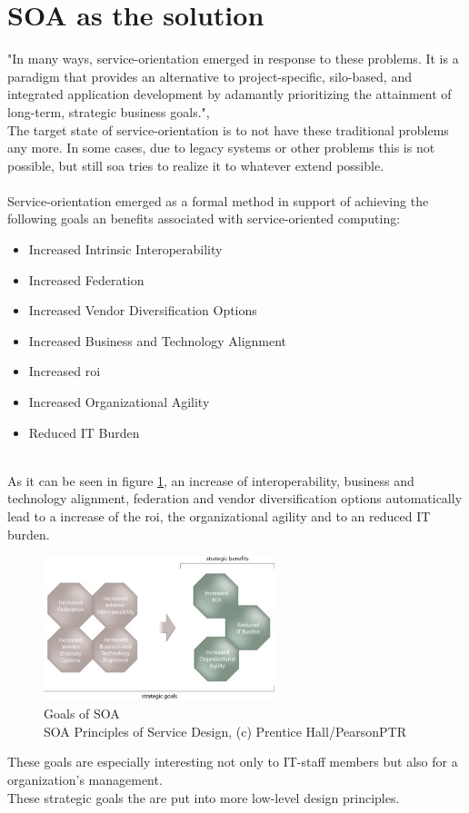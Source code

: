 \documentclass[12pt]{article}
\begin{document}
\section{SOA as the solution} 
"In many ways, service-orientation emerged in response to these problems. It is a paradigm that provides an alternative to project-specific, silo-based, and integrated application development by adamantly prioritizing the attainment of long-term, strategic business goals.",\cite[page 522]{grau} \\
The target state of service-orientation is to not have these traditional problems any more. In some cases, due to legacy systems or other problems this is not possible, but still \gls{soa} tries to realize it to whatever extend possible.
\\ \\
Service-orientation emerged as a formal method in support of achieving the following goals an benefits associated with service-oriented computing: \\
\begin{itemize}
\item Increased Intrinsic Interoperability
\item Increased Federation
\item Increased Vendor Diversification Options 
\item Increased Business and Technology Alignment
\item Increased \gls{roi}
\item Increased Organizational Agility
\item Reduced IT Burden
\end{itemize} \cite[page 23]{grau}\\
As it can be seen in figure \ref{fig:goalssoa}, an increase of interoperability,  business and technology alignment, federation and vendor diversification options automatically lead to a increase of the \gls{roi}, the organizational agility and to an reduced IT burden.
\begin{figure}
	\centering
	\includegraphics[width=0.6\textwidth]{images/page24}
	\caption{Goals of SOA\cite{photos}\\ SOA Principles of Service Design, (c) Prentice Hall/PearsonPTR}
	\label{fig:goalssoa}
	\end{figure}
\FloatBarrier
 \noindent
These goals are especially interesting not only to IT-staff members but also for a organization's management. \\
These strategic goals the are put into more low-level design principles.
\end{document}
